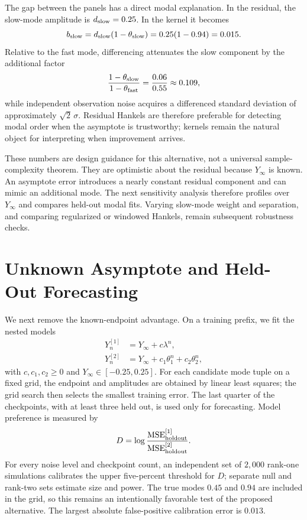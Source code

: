 \documentclass[10pt,twocolumn]{article}
\begin{document}
The gap between the panels has a direct modal explanation.  In the residual,
the slow-mode amplitude is $d_{\rm slow}=0.25$.  In the kernel it becomes
\[
 b_{\rm slow}
 =
 d_{\rm slow}(1-\theta_{\rm slow})
 =
 0.25(1-0.94)=0.015.
\]
Relative to the fast mode, differencing attenuates the slow component by the
additional factor
\begin{equation}\label{eq:slow-attenuation}
 \frac{1-\theta_{\rm slow}}{1-\theta_{\rm fast}}
 =
 \frac{0.06}{0.55}
 \approx0.109,
\end{equation}
while independent observation noise acquires a differenced standard deviation
of approximately $\sqrt2\,\sigma$.  Residual Hankels are therefore preferable
for detecting modal order when the asymptote is trustworthy; kernels remain
the natural object for interpreting when improvement arrives.

These numbers are design guidance for this alternative, not a universal
sample-complexity theorem.  They are optimistic about the residual because
$Y_\infty$ is known.  An asymptote error introduces a nearly constant residual
component and can mimic an additional mode.  The next sensitivity analysis
therefore profiles over $Y_\infty$ and compares held-out modal fits.  Varying
slow-mode weight and separation, and comparing regularized or windowed
Hankels, remain subsequent robustness checks.

\section{Unknown Asymptote and Held-Out Forecasting}

We next remove the known-endpoint advantage.  On a training prefix, we fit
the nested models
\begin{align}
 Y_n^{[1]}&=Y_\infty+c\lambda^n,\label{eq:unknown-rank-one}\\
 Y_n^{[2]}&=Y_\infty+c_1\theta_1^n+c_2\theta_2^n,\label{eq:unknown-rank-two}
\end{align}
with $c,c_1,c_2\geq0$ and $Y_\infty\in[-0.25,0.25]$.  For each candidate
mode tuple on a fixed grid, the endpoint and amplitudes are obtained by linear
least squares; the grid search then selects the smallest training error.  The
last quarter of the checkpoints, with at least three held out, is used only for
forecasting.  Model preference is measured by
\begin{equation}\label{eq:heldout-score}
 D=\log\frac{\operatorname{MSE}_{\rm holdout}^{[1]}}
                 {\operatorname{MSE}_{\rm holdout}^{[2]}}.
\end{equation}
For every noise level and checkpoint count, an independent set of $2{,}000$
rank-one simulations calibrates the upper five-percent threshold for $D$;
separate null and rank-two sets estimate size and power.  The true modes
$0.45$ and $0.94$ are included in the grid, so this remains an intentionally
favorable test of the proposed alternative.  The largest absolute
false-positive calibration error is $0.013$.
\end{document}
